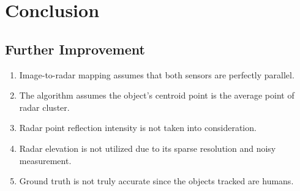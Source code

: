 
\chapter{Conclusion}\label{chap:conclusion}


\section{Further Improvement}
\begin{enumerate}
    \item Image-to-radar mapping assumes that both sensors are perfectly parallel.
    \item The algorithm assumes the object's centroid point is the average point of radar cluster.
    \item Radar point reflection intensity is not taken into consideration.
    \item Radar elevation is not utilized due to its sparse resolution and noisy measurement.
    \item Ground truth is not truly accurate since the objects tracked are humans.
\end{enumerate}
